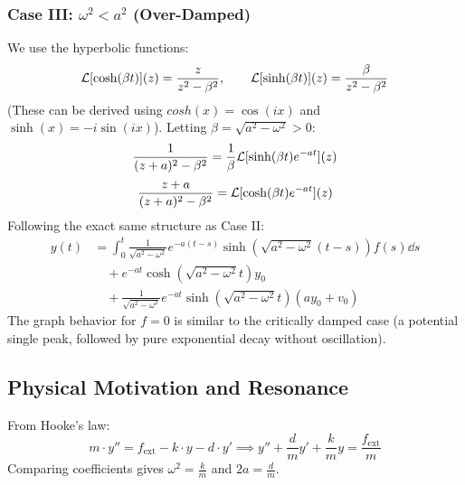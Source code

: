 \begin{center}
\end{center}


\subsubsection{Case III: $\omega^2 < a^2$ (Over-Damped)}

We use the hyperbolic functions:
\[
\mathcal{L}[\cosh(\beta t)](z) = \frac{z}{z^2 - \beta^2}, \qquad \mathcal{L}[\sinh(\beta t)](z) = \frac{\beta}{z^2 - \beta^2}
\]
(These can be derived using $cosh(x) = \cos(ix)$ and $\sinh(x) = -i\sin(ix)$). Letting $\beta = \sqrt{a^2 - \omega^2} > 0$:
\[
\frac{1}{(z+a)^2 - \beta^2} = \frac{1}{\beta} \mathcal{L}[\sinh(\beta t)e^{-at}](z)
\]
\[
\frac{z+a}{(z+a)^2 - \beta^2} = \mathcal{L}[\cosh(\beta t)e^{-at}](z)
\]
Following the exact same structure as Case II:
\begin{align*}
y(t) &= \int_{0}^{t} \frac{1}{\sqrt{a^2-\omega^2}} e^{-a(t-s)} \sinh\left(\sqrt{a^2-\omega^2}(t-s)\right)f(s)\dd s \\
&\quad + e^{-at}\cosh\left(\sqrt{a^2-\omega^2}t\right)y_0 \\
&\quad + \frac{1}{\sqrt{a^2-\omega^2}}e^{-at}\sinh\left(\sqrt{a^2-\omega^2}t\right)(ay_0 + v_0)
\end{align*}
The graph behavior for $f=0$ is similar to the critically damped case (a potential single peak, followed by pure exponential decay without oscillation).


\subsection{Physical Motivation and Resonance}
From Hooke's law:
\[
m \cdot y'' = f_{\text{ext}} - k \cdot y - d \cdot y' \implies y'' + \frac{d}{m}y' + \frac{k}{m}y = \frac{f_{\text{ext}}}{m}
\]
Comparing coefficients gives $\omega^2 = \frac{k}{m}$ and $2a = \frac{d}{m}$. 

